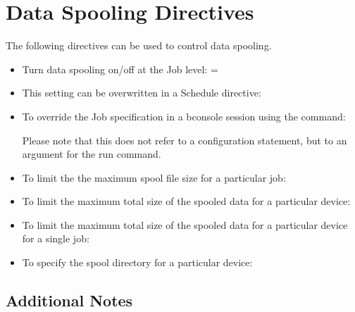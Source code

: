 \section{Data Spooling Directives}

The following directives can be used to control data spooling.

\begin{itemize}
\item Turn data spooling on/off at the Job level:  = \dtYesNo

\item  This setting can be overwritten in a Schedule  directive: 
\dtYesNo

\item To override the Job specification in a bconsole session using the 
   command: \dtYesNo

   Please note that this does not refer to a configuration
   statement, but to an argument for the run command.


\item To limit the the maximum spool file size for a particular job: 

\item To limit the maximum total size of the spooled data  for a particular
   device: 

\item To limit the maximum total size of the spooled data  for a particular
   device for a single job:  

\item To specify the spool directory for a particular device: 

\end{itemize}

\subsection{Additional Notes}

